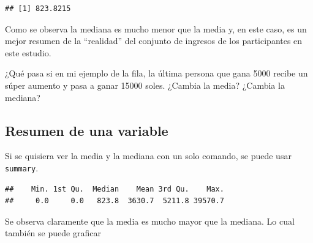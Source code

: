 \documentclass[
]{article}
\newenvironment{Shaded}{\begin{snugshade}}{\end{snugshade}}
\newcommand{\AttributeTok}[1]{\textcolor[rgb]{0.77,0.63,0.00}{#1}}
\newcommand{\DecValTok}[1]{\textcolor[rgb]{0.00,0.00,0.81}{#1}}
\newcommand{\FunctionTok}[1]{\textcolor[rgb]{0.00,0.00,0.00}{#1}}
\newcommand{\NormalTok}[1]{#1}
\newcommand{\SpecialCharTok}[1]{\textcolor[rgb]{0.00,0.00,0.00}{#1}}
\newcommand{\StringTok}[1]{\textcolor[rgb]{0.31,0.60,0.02}{#1}}
\begin{document}
\begin{Shaded}
\end{Shaded}

\begin{verbatim}
## [1] 823.8215
\end{verbatim}

Como se observa la mediana es mucho menor que la media y, en este caso,
es un mejor resumen de la ``realidad'' del conjunto de ingresos de los
participantes en este estudio.

¿Qué pasa si en mi ejemplo de la fila, la última persona que gana 5000
recibe un súper aumento y pasa a ganar 15000 soles. ¿Cambia la media?
¿Cambia la mediana?

\hypertarget{resumen-de-una-variable}{%
\subsection{Resumen de una variable}\label{resumen-de-una-variable}}

Si se quisiera ver la media y la mediana con un solo comando, se puede
usar \texttt{summary}.

\begin{Shaded}
\end{Shaded}

\begin{verbatim}
##    Min. 1st Qu.  Median    Mean 3rd Qu.    Max. 
##     0.0     0.0   823.8  3630.7  5211.8 39570.7
\end{verbatim}

Se observa claramente que la media es mucho mayor que la mediana. Lo
cual también se puede graficar

\begin{Shaded}
\end{Shaded}
\end{document}
